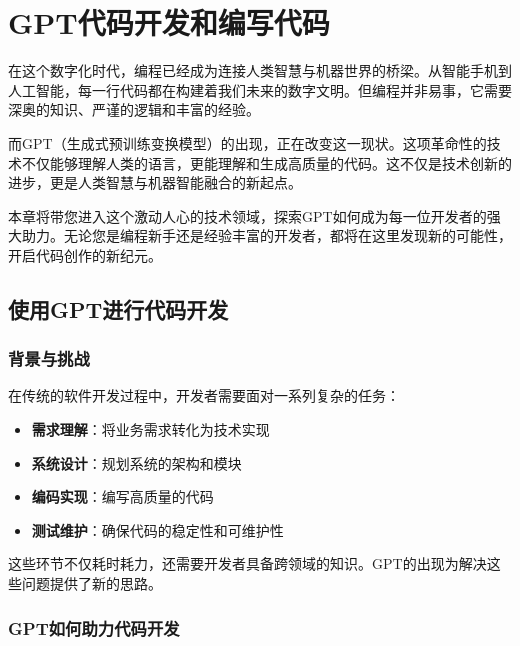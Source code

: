 \hypertarget{gptux4ee3ux7801ux5f00ux53d1ux548cux7f16ux5199ux4ee3ux7801}{%
  \section{GPT代码开发和编写代码}\label{gptux4ee3ux7801ux5f00ux53d1ux548cux7f16ux5199ux4ee3ux7801}}


在这个数字化时代，编程已经成为连接人类智慧与机器世界的桥梁。从智能手机到人工智能，每一行代码都在构建着我们未来的数字文明。但编程并非易事，它需要深奥的知识、严谨的逻辑和丰富的经验。

而GPT（生成式预训练变换模型）的出现，正在改变这一现状。这项革命性的技术不仅能够理解人类的语言，更能理解和生成高质量的代码。这不仅是技术创新的进步，更是人类智慧与机器智能融合的新起点。

本章将带您进入这个激动人心的技术领域，探索GPT如何成为每一位开发者的强大助力。无论您是编程新手还是经验丰富的开发者，都将在这里发现新的可能性，开启代码创作的新纪元。

\hypertarget{ux4f7fux7528gptux8fdbux884cux4ee3ux7801ux5f00ux53d1}{%
  \subsection{使用GPT进行代码开发}\label{ux4f7fux7528gptux8fdbux884cux4ee3ux7801ux5f00ux53d1}}

\hypertarget{ux80ccux666fux4e0eux6311ux6218}{%
  \subsubsection{背景与挑战}\label{ux80ccux666fux4e0eux6311ux6218}}

在传统的软件开发过程中，开发者需要面对一系列复杂的任务：

\begin{itemize}
  \item
        \textbf{需求理解}：将业务需求转化为技术实现
  \item
        \textbf{系统设计}：规划系统的架构和模块
  \item
        \textbf{编码实现}：编写高质量的代码
  \item
        \textbf{测试维护}：确保代码的稳定性和可维护性
\end{itemize}

这些环节不仅耗时耗力，还需要开发者具备跨领域的知识。GPT的出现为解决这些问题提供了新的思路。

\hypertarget{gptux5982ux4f55ux52a9ux529bux4ee3ux7801ux5f00ux53d1}{%
  \subsubsection{GPT如何助力代码开发}\label{gptux5982ux4f55ux52a9ux529bux4ee3ux7801ux5f00ux53d1}}

